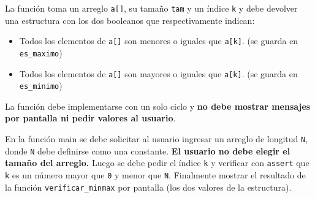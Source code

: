 \documentclass{article}
\begin{document}
La función toma un arreglo \texttt{a[]}, su tamaño \texttt{tam} y un índice \texttt{k} y debe devolver una estructura con los dos booleanos que respectivamente indican:
\begin{itemize}
    \item Todos los elementos de \texttt{a[]} son menores o iguales que \texttt{a[k]}. (se guarda en \texttt{es\_maximo})
    \item Todos los elementos de \texttt{a[]} son mayores o iguales que \texttt{a[k]}. (se guarda en \texttt{es\_minimo})
\end{itemize}
La función debe implementarse con un solo ciclo y \textbf{no debe mostrar mensajes por pantalla ni pedir valores al usuario}.

En la función main se debe solicitar al usuario ingresar un arreglo de longitud \texttt{N}, donde \texttt{N} debe definirse como una constante. \textbf{El usuario no debe elegir el tamaño del arreglo.} Luego se debe pedir el índice \texttt{k} y verificar con \texttt{assert} que \texttt{k} es un número mayor que \texttt{0} y menor que \texttt{N}. Finalmente mostrar el resultado de la función \texttt{verificar\_minmax} por pantalla (los dos valores de la estructura).
\end{document}

